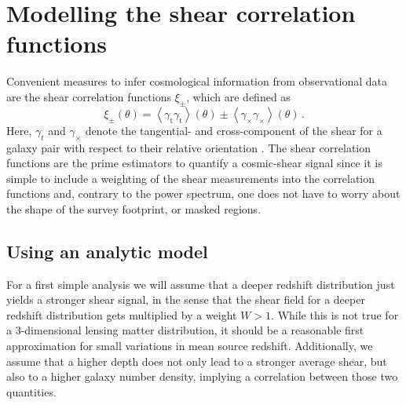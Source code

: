 \documentclass[referee]{aa} %
\renewcommand{\[}{\begin{equation}}
\renewcommand{\]}{\end{equation}}
\renewcommand{\rm}{\mathrm}
\def\la{\left<}
\def\ra{\right>}
\begin{document}

\section{Modelling the shear correlation functions}
\label{sec:xipm}
Convenient measures to infer cosmological information from observational data are the shear correlation functions $\xi_\pm$, which are defined as \[
\xi_\pm(\theta) = \la \gamma_{\rm t}\gamma_{\rm t}\ra(\theta) \pm \la \gamma_\times\gamma_\times\ra(\theta) \, .
\]
Here, $\gamma_t$ and $\gamma_\times$ denote the tangential- and cross-component of the shear for a galaxy pair with respect to their relative orientation \citep[compare][]{2002A&A...396....1S}.
The shear correlation functions are the prime estimators to quantify a cosmic-shear signal since it is simple to include a weighting of the shear measurements into the correlation functions and, contrary to the power spectrum, one does not have to worry about the shape of the survey footprint, or masked regions. 
\subsection{Using an analytic model}
\label{sec:xipm_analytic}
For a first simple analysis we will assume that a deeper redshift distribution just yields a stronger shear signal, in the sense that the shear field for a deeper redshift distribution gets multiplied by a weight $W>1$. While this is not true for a 3-dimensional lensing matter distribution, it should be a reasonable first approximation for small variations in mean source redshift. Additionally, we assume that a higher depth does not only lead to a stronger average shear, but also to a higher galaxy number density, implying a correlation between those two quantities.
\end{document}

